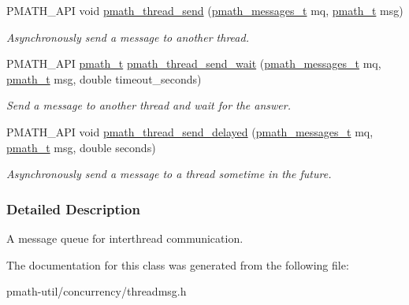 \begin{CompactItemize}
PMATH\_\-API void \hyperlink{group__threadmsg_ga3867a708fb07b86e017e8f201ef7edd}{pmath\_\-thread\_\-send} (\hyperlink{classpmath__messages__t}{pmath\_\-messages\_\-t} mq, \hyperlink{classpmath__t}{pmath\_\-t} msg)
\begin{CompactList}\small\item\em Asynchronously send a message to another thread. \item\end{CompactList}\item 
PMATH\_\-API \hyperlink{classpmath__t}{pmath\_\-t} \hyperlink{group__threadmsg_g0466f7731e5e7cc3c4361f9512795a1c}{pmath\_\-thread\_\-send\_\-wait} (\hyperlink{classpmath__messages__t}{pmath\_\-messages\_\-t} mq, \hyperlink{classpmath__t}{pmath\_\-t} msg, double timeout\_\-seconds)
\begin{CompactList}\small\item\em Send a message to another thread and wait for the answer. \item\end{CompactList}\item 
PMATH\_\-API void \hyperlink{group__threadmsg_g75339d9dd1902293cb72b38e77caa742}{pmath\_\-thread\_\-send\_\-delayed} (\hyperlink{classpmath__messages__t}{pmath\_\-messages\_\-t} mq, \hyperlink{classpmath__t}{pmath\_\-t} msg, double seconds)
\begin{CompactList}\small\item\em Asynchronously send a message to a thread sometime in the future. \item\end{CompactList}\end{CompactItemize}


\subsubsection{Detailed Description}
A message queue for interthread communication. 

The documentation for this class was generated from the following file:\begin{CompactItemize}
\item 
pmath-util/concurrency/threadmsg.h\end{CompactItemize}
